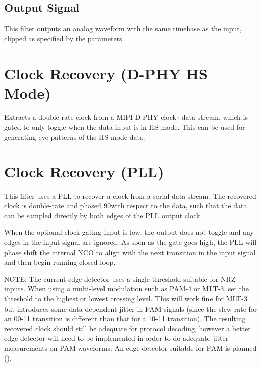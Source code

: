 \subsection{Output Signal}

This filter outputs an analog waveform with the same timebase as the input, clipped as specified by the parameters.

\pagebreak
\section{Clock Recovery (D-PHY HS Mode)}

Extracts a double-rate clock from a MIPI D-PHY clock+data stream, which is gated to only toggle when the data input
is in HS mode. This can be used for generating eye patterns of the HS-mode data.

\pagebreak
\section{Clock Recovery (PLL)}
\label{filter:cdrpll}

This filter uses a PLL to recover a clock from a serial data stream. The recovered clock is double-rate and
phased 90\textdegree with respect to the data, such that the data can be sampled directly by both edges of the PLL
output clock.

When the optional clock gating input is low, the output does not toggle and any edges in the input signal are ignored.
As soon as the gate goes high, the PLL will phase shift the internal NCO to align with the next transition in the input
signal and then begin running closed-loop.

NOTE: The current edge detector uses a single threshold suitable for NRZ inputs. When using a multi-level modulation
such as PAM-4 or MLT-3, set the threshold to the highest or lowest crossing level. This will work fine for MLT-3 but
introduces some data-dependent jitter in PAM signals (since the slew rate for an 00-11 transition is different than
that for a 10-11 transition). The resulting recovered clock should still be adequate for protocol decoding, however a
better edge detector will need to be implemented in order to do adequate jitter measurements on PAM waveforms. An edge
detector suitable for PAM is planned ().

